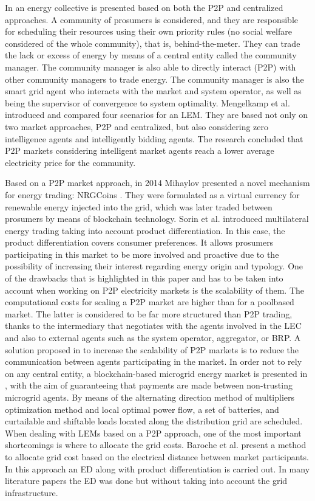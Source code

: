 In \cite{moret2018energy} an energy collective is presented based on both the P2P and centralized approaches. A community of prosumers is considered, and they are responsible for scheduling their resources using their own priority rules (no social welfare considered of the whole community), that is, behind-the-meter. They can trade the lack or excess of energy by means of a central entity called the community manager. The community manager is also able to directly interact (P2P) with other community managers to trade energy. The community manager is also the smart grid agent who interacts with the market and system operator, as well as being the supervisor of convergence to system optimality. Mengelkamp et al. \cite{mengelkamp2017trading} introduced and compared four scenarios for an LEM. They are based not only on two market approaches, P2P and centralized, but also considering zero intelligence agents and intelligently bidding agents. The research concluded that P2P markets considering intelligent market agents reach a lower average electricity price for the community.

Based on a P2P market approach, in 2014 Mihaylov presented a novel mechanism for energy trading: NRGCoins \cite{mihaylov2014nrgcoin}. They were formulated as a virtual currency for renewable energy injected into the grid, which was later traded between prosumers by means of blockchain technology. Sorin et al. \cite{sorin2018consensus} introduced multilateral energy trading taking into account product differentiation. In this case, the product differentiation covers consumer preferences. It allows prosumers participating in this market to be more involved and proactive due to the possibility of increasing their interest regarding energy origin and typology. One of the drawbacks that is highlighted in this paper and has to be taken into account when working on P2P electricity markets is the scalability of them. The computational costs for scaling a P2P market are higher than for a poolbased market. The latter is considered to be far more structured than P2P trading, thanks to the intermediary that negotiates with the agents involved in the LEC and also to external agents such as the system operator, aggregator, or BRP. A solution proposed in \cite{sorin2018consensus} to increase the scalability of P2P markets is to reduce the communication between agents participating in the market. In order not to rely on any central entity, a blockchain-based microgrid energy market is presented in \cite{munsing2017blockchains}, with the aim of guaranteeing that payments are made between non-trusting microgrid agents. By means of the alternating direction method of multipliers optimization method and local optimal power flow, a set of batteries, and curtailable and shiftable loads located along the distribution grid are scheduled. When dealing with LEMs based on a P2P approach, one of the most important shortcomings is where to allocate the grid costs. Baroche et al. \cite{baroche2018exogenous} present a method to
allocate grid cost based on the electrical distance between market participants. In this approach an ED along with product differentiation is carried out. In many literature papers the ED was done but without taking into account the grid infrastructure.


